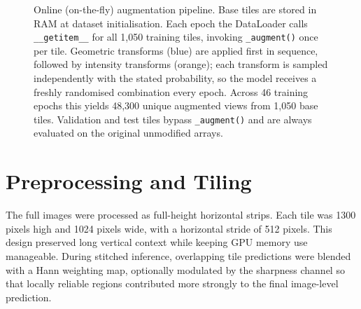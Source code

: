 \documentclass[11pt,letterpaper]{article}
\begin{document}
\begin{figure}[htbp]
{%
}
\caption{Online (on-the-fly) augmentation pipeline. Base tiles are stored in RAM at dataset initialisation. Each epoch the DataLoader calls \texttt{\_\_getitem\_\_} for all 1,050 training tiles, invoking \texttt{\_augment()} once per tile. Geometric transforms (blue) are applied first in sequence, followed by intensity transforms (orange); each transform is sampled independently with the stated probability, so the model receives a freshly randomised combination every epoch. Across 46 training epochs this yields 48,300 unique augmented views from 1,050 base tiles. Validation and test tiles bypass \texttt{\_augment()} and are always evaluated on the original unmodified arrays.}
\label{fig:augmentation-pipeline}
\end{figure}

\section{Preprocessing and Tiling}
The full images were processed as full-height horizontal strips. Each tile was 1300 pixels high and 1024 pixels wide, with a horizontal stride of 512 pixels. This design preserved long vertical context while keeping GPU memory use manageable. During stitched inference, overlapping tile predictions were blended with a Hann weighting map, optionally modulated by the sharpness channel so that locally reliable regions contributed more strongly to the final image-level prediction.
\end{document}
